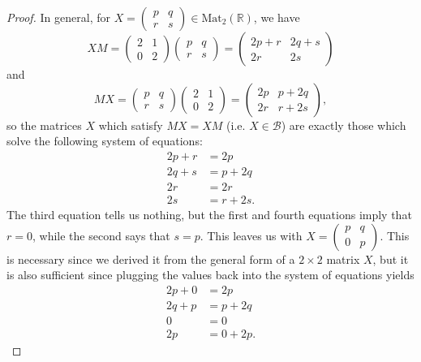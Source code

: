 \documentclass[12pt]{article}
\theoremstyle{definition}
\begin{document}
\begin{proof}
	In general, for $X = \begin{pmatrix}p & q \\ r & s\end{pmatrix} \in \mathrm{Mat}_2(\mathbb{R})$, we have \begin{equation*}
		XM = \begin{pmatrix}
			2 & 1 \\ 0 & 2
		\end{pmatrix}\begin{pmatrix}
			p & q \\ r & s
		\end{pmatrix} = \begin{pmatrix}
			2p + r & 2q + s \\ 2r & 2s
		\end{pmatrix}
	\end{equation*}
	and \begin{equation*}
		MX = \begin{pmatrix}
			p & q \\ r & s
		\end{pmatrix}\begin{pmatrix}
			2 & 1 \\ 0 & 2
		\end{pmatrix} = \begin{pmatrix}
			2p & p + 2q \\ 2r & r + 2s
		\end{pmatrix},
	\end{equation*}
	so the matrices $X$ which satisfy $MX = XM$ (i.e. $X \in \mathcal{B}$) are exactly those which solve the following system of equations: \begin{align*}
		2p + r & = 2p      \\
		2q + s & = p + 2q  \\
		2r     & = 2r      \\
		2s     & = r + 2s.
	\end{align*}
	The third equation tells us nothing, but the first and fourth equations imply that $r = 0$, while the second says that $s = p$.
	This leaves us with $X = \begin{pmatrix}p & q \\ 0 & p\end{pmatrix}$.
	This is necessary since we derived it from the general form of a $2 \times 2$ matrix $X$, but it is also sufficient since plugging the values back into the system of equations yields \begin{align*}
		2p + 0 & = 2p      \\
		2q + p & = p + 2q  \\
		0      & = 0       \\
		2p     & = 0 + 2p.
	\end{align*}


\end{proof}
\end{document}
